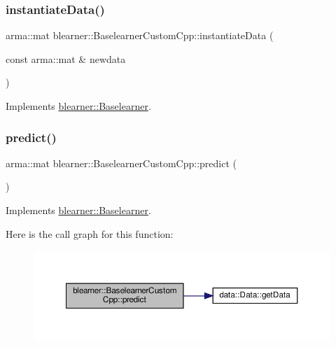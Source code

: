 \subsubsection{\texorpdfstring{instantiate\+Data()}{instantiateData()}}
{\footnotesize\ttfamily arma\+::mat blearner\+::\+Baselearner\+Custom\+Cpp\+::instantiate\+Data (\begin{DoxyParamCaption}\item[{const arma\+::mat \&}]{newdata }\end{DoxyParamCaption})\hspace{0.3cm}{\ttfamily [virtual]}}



Implements \hyperlink{classblearner_1_1_baselearner_af01f1b8c4540927705ff79c3649489f7}{blearner\+::\+Baselearner}.

\mbox{\label{classblearner_1_1_baselearner_custom_cpp_a88c17ed1e32255e482f34695e06e7d25}} 
\subsubsection{\texorpdfstring{predict()}{predict()}\hspace{0.1cm}{\footnotesize\ttfamily [1/2]}}
{\footnotesize\ttfamily arma\+::mat blearner\+::\+Baselearner\+Custom\+Cpp\+::predict (\begin{DoxyParamCaption}{ }\end{DoxyParamCaption})\hspace{0.3cm}{\ttfamily [virtual]}}



Implements \hyperlink{classblearner_1_1_baselearner_ab37986047db43c84420fef2cef7fc20d}{blearner\+::\+Baselearner}.

Here is the call graph for this function\+:
\nopagebreak
\begin{figure}[H]
\begin{center}
\leavevmode
\includegraphics[width=350pt]{classblearner_1_1_baselearner_custom_cpp_a88c17ed1e32255e482f34695e06e7d25_cgraph}
\end{center}
\end{figure}
\mbox{\label{classblearner_1_1_baselearner_custom_cpp_a55fb45a929fea01f79fa3dcad7698174}} 

